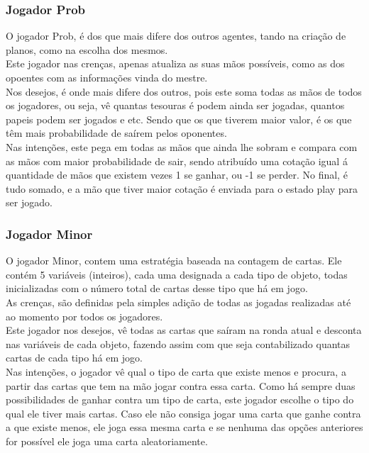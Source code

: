 \documentclass[12pt]{article}
\begin{document}
	\subsubsection*{Jogador Prob}
    O jogador Prob, é dos que mais difere dos outros agentes, tando na criação de planos, como na escolha dos mesmos.\\
    Este jogador nas crenças, apenas atualiza as suas mãos possíveis, como as dos opoentes com as informações vinda do mestre.\\
    Nos desejos, é onde mais difere dos outros, pois este soma todas as mãos de todos os jogadores, ou seja, vê quantas tesouras é podem ainda ser jogadas, quantos papeis podem ser jogados e etc. Sendo que os que tiverem maior valor, é os que têm mais probabilidade de saírem pelos oponentes.\\
    Nas intenções, este pega em todas as mãos que ainda lhe sobram e compara com as mãos com maior probabilidade de sair, sendo atribuído uma cotação igual á quantidade de mãos que existem vezes 1 se ganhar, ou -1 se perder. No final, é tudo somado, e a mão que tiver maior cotação é enviada para o estado play para ser jogado.\\


	\subsubsection*{Jogador Minor}
    O jogador Minor, contem uma estratégia baseada na contagem de cartas. Ele contém 5 variáveis (inteiros), cada uma designada a cada tipo de objeto, todas inicializadas com o número total de cartas desse tipo que há em jogo.\\
    As crenças, são definidas pela simples adição de todas as jogadas realizadas até ao momento por todos os jogadores.\\
    Este jogador nos desejos, vê todas as cartas que saíram na ronda atual e desconta nas variáveis de cada objeto, fazendo assim com que seja contabilizado quantas cartas de cada tipo há em jogo.\\
    Nas intenções, o jogador vê qual o tipo de carta que existe menos e procura, a partir das cartas que tem na mão jogar contra essa carta. Como há sempre duas possibilidades de ganhar contra um tipo de carta, este jogador escolhe o tipo do qual ele tiver mais cartas. Caso ele não consiga jogar uma carta que ganhe contra a que existe menos, ele joga essa mesma carta e se nenhuma das opções anteriores for possível ele joga uma carta aleatoriamente.\\
\end{document}
